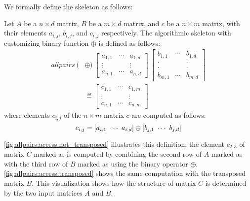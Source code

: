 We formally define the \allpairs skeleton as follows:

\begin{definition}
  \label{def:allpairs}
  Let $A$ be a $n\times d$ matrix, $B$ be a $m\times d$ matrix, and $c$ be a $n\times m$ matrix, with their elements $a_{i,j}$, $b_{i,j}$, and $c_{i,j}$ respectively.
  The algorithmic skeleton \allpairs with customizing binary function $\oplus$ is defined as follows:
  \begin{equation*}
    \begin{split}
    allpairs\ (&\oplus)\
      \left[ \begin{array}{ccc} a_{1,1} & \cdots & a_{1,d}\\[.25em] \vdots & & \vdots\\[.25em] a_{n,1} & \cdots & a_{n,d} \end{array}\right]\ %
      \left[ \begin{array}{ccc} b_{1,1} & \cdots & b_{1,d}\\[-.25em] \cdot & & \cdot\\[-.75em] \cdot & & \cdot\\[-.25em] b_{m,1} & \cdots & b_{m,d} \end{array}\right]%
      \\
    &\eqdef \left[ \begin{array}{ccc} c_{1,1} & \cdots & c_{1,m}\\[.25em] \vdots & & \vdots\\[.25em] c_{n,1} & \cdots & c_{n,m} \end{array} \right]
    \end{split}
  \end{equation*}
  where elements $c_{i,j}$ of the $n\times m$ matrix $c$ are computed as follows:
  \[
    c_{i,j} = \left[a_{i,1}\ \cdots\ a_{i,d}\right] \oplus \left[b_{j,1}\ \cdots\ b_{j,d}\right]
  \]
\end{definition}

\autoref{fig:allpairs:access:not_transposed} illustrates this definition:
the element $c_{2,3}$ of matrix $C$ marked as \circled{3} is computed by combining the second row of $A$ marked as  with the third row of $B$ marked as  using the binary operator $\oplus$.
\autoref{fig:allpairs:access:transposed} shows the same computation with the transposed matrix $B$.
This visualization shows how the structure of matrix $C$ is determined by the two input matrices $A$ and $B$.

